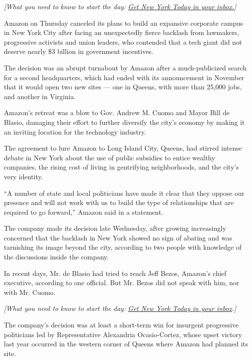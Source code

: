 \emph{{[}What you need to know to start the day:}
\href{https://www.nytimes3xbfgragh.onion/newsletters/newyorktoday?module=inline}{\emph{Get
New York Today in your inbox.}}\emph{{]}}

Amazon on Thursday canceled its plans to build an expansive corporate
campus in New York City after facing an unexpectedly fierce backlash
from lawmakers, progressive activists and union leaders, who contended
that a tech giant did not deserve nearly \$3 billion in government
incentives.

The decision was an abrupt turnabout by Amazon after a much-publicized
search for a second headquarters, which had ended with its announcement
in November that it would open two new sites --- one in Queens, with
more than 25,000 jobs, and another in Virginia.

Amazon's retreat was a blow to Gov. Andrew M. Cuomo and Mayor Bill de
Blasio, damaging their effort to further diversify the city's economy by
making it an inviting location for the technology industry.

The agreement to lure Amazon to Long Island City, Queens, had stirred
intense debate in New York about the use of public subsidies to entice
wealthy companies, the rising cost of living in gentrifying
neighborhoods, and the city's very identity.

``A number of state and local politicians have made it clear that they
oppose our presence and will not work with us to build the type of
relationships that are required to go forward,'' Amazon said in a
statement.

The company made its decision late Wednesday, after growing increasingly
concerned that the backlash in New York showed no sign of abating and
was tarnishing its image beyond the city, according to two people with
knowledge of the discussions inside the company.

In recent days, Mr. de Blasio had tried to reach Jeff Bezos, Amazon's
chief executive, according to one official. But Mr. Bezos did not speak
with him, nor with Mr. Cuomo.

\emph{{[}What you need to know to start the day:}
\href{https://www.nytimes3xbfgragh.onion/newsletters/newyorktoday?module=inline}{\emph{Get
New York Today in your inbox}}\emph{.{]}}

The company's decision was at least a short-term win for insurgent
progressive politicians led by Representative Alexandria Ocasio-Cortez,
whose upset victory last year occurred in the western corner of Queens
where Amazon had planned its site.

